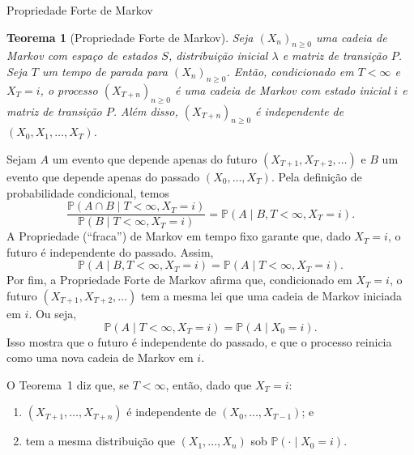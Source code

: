 \documentclass[12pt,letterpaper]{article}
\newtheorem{theorem}{Teorema}
\begin{document}
\begin{center}
  {\LARGE Propriedade Forte de Markov}
\end{center}

\bigskip

\begin{theorem}[Propriedade Forte de Markov]
  Seja $(X_n)_{n \geq 0}$ uma cadeia de Markov com espaço de estados
  $S$, distribuição inicial $\lambda$ e matriz de transição $P$.  Seja
  $T$ um tempo de parada para $(X_n)_{n \geq 0}$.  Então, condicionado
  em $T < \infty$ e $X_T = i$, o processo \( (X_{T+n})_{n \geq 0}\) é
  uma cadeia de Markov com estado inicial $i$ e matriz de transição
  $P$.  Além disso, $(X_{T+n})_{n \geq 0}$ é independente de
  $(X_0, X_1, \dots, X_T)$.
\end{theorem}



Sejam $A$ um evento que depende apenas do futuro
$(X_{T+1},X_{T+2},\dots)$ e $B$ um evento que depende apenas do passado
$(X_0,\dots,X_T)$. Pela definição de probabilidade condicional, temos
\[
\frac{\mathbb{P}(A \cap B \mid T<\infty, X_T=i)}{\mathbb{P}(B \mid T<\infty, X_T=i)}
= \mathbb{P}(A \mid B, T<\infty, X_T=i).
\]
A Propriedade (``fraca'') de Markov em tempo fixo garante que, dado
$X_T=i$, o futuro é independente do passado. Assim,
\[
\mathbb{P}(A \mid B, T<\infty, X_T=i) 
= \mathbb{P}(A \mid T<\infty, X_T=i).
\]
Por fim, a Propriedade Forte de Markov afirma que, condicionado em
$X_T=i$, o futuro $(X_{T+1},X_{T+2},\dots)$ tem a mesma lei que uma
cadeia de Markov iniciada em $i$. Ou seja,
\[
\mathbb{P}(A \mid T<\infty, X_T=i) = \mathbb{P} (A \mid X_0=i).
\]
Isso mostra que o futuro é independente do passado, e que o processo
reinicia como uma nova cadeia de Markov em $i$.

O Teorema~1 diz que, se \(T < \infty\), então, dado que \(X_T = i\):
\begin{enumerate}[label=(\roman*), noitemsep]
\item \((X_{T+1}, \ldots, X_{T+n})\) é independente de
  \((X_0, \ldots, X_{T-1})\); e
\item tem a mesma distribuição que \((X_1, \ldots, X_n)\) sob
  $\mathbb P(\cdot\mid X_0=i)$.
\end{enumerate}
\end{document}
